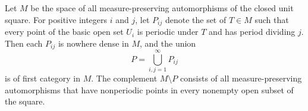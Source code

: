 Let $M$ be the space of all measure-preserving automorphisms of the closed unit square. For positive integers $i$ and $j$, let $P_{ij}$ denote the set of $T \in M$ such that every point of the basic open set $U_i$ is periodic under $T$ and has period dividing $j$. Then each $P_{ij}$ is nowhere dense in $M$, and the union
$$P = \bigcup_{i,j=1}^{\infty} P_{ij}$$
is of first category in $M$. The complement $M \setminus P$ consists of all measure-preserving automorphisms that have nonperiodic points in every nonempty open subset of the square.
